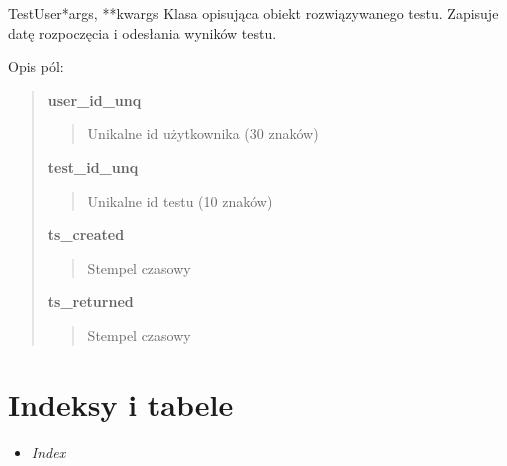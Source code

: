 \documentclass[letterpaper,10pt,polish]{manual}
\begin{document}
\hypertarget{knut\_server.tests.models.TestUser}{}\begin{classdesc}{TestUser}{*args, **kwargs}
Klasa opisująca obiekt rozwiązywanego testu. Zapisuje datę rozpoczęcia i odesłania wyników testu.

Opis pól:
\begin{quote}

\textbf{user\_id\_unq}
\begin{quote}

Unikalne id użytkownika (30 znaków)
\end{quote}

\textbf{test\_id\_unq}
\begin{quote}

Unikalne id testu (10 znaków)
\end{quote}

\textbf{ts\_created}
\begin{quote}

Stempel czasowy
\end{quote}

\textbf{ts\_returned}
\begin{quote}

Stempel czasowy
\end{quote}
\end{quote}
\end{classdesc}


\chapter{Indeksy i tabele}
\begin{itemize}
\item {} 
\emph{Index}

\end{itemize}


\renewcommand{\indexname}{Indeks modułów}
\printmodindex
\renewcommand{\indexname}{Indeks}
\printindex
\end{document}
